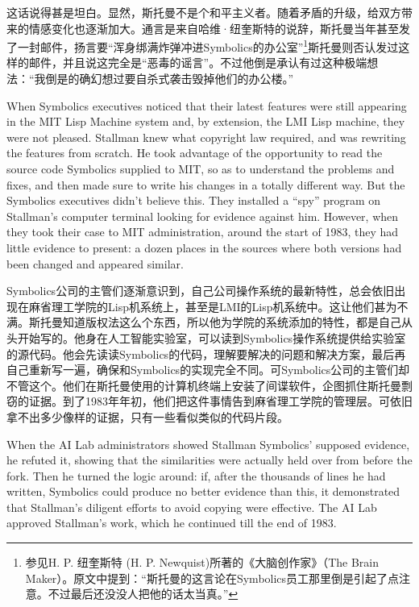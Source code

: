 \ifdefined\chs
这话说得甚是坦白。显然，斯托曼不是个和平主义者。随着矛盾的升级，给双方带来的情感变化也逐渐加大。通言是来自哈维·纽奎斯特的说辞，斯托曼当年甚至发了一封邮件，扬言要``浑身绑满炸弹冲进Symbolics的办公室''\footnote{参见H. P. 纽奎斯特 (H. P. Newquist)所著的《大脑创作家》（The Brain Maker）。原文中提到：``斯托曼的这言论在Symbolics员工那里倒是引起了点注意。不过最后还没没人把他的话太当真。''}斯托曼则否认发过这样的邮件，并且说这完全是``恶毒的谣言''。不过他倒是承认有过这种极端想法：``我倒是的确幻想过要自杀式袭击毁掉他们的办公楼。''
\fi
\fi

\ifdefined\vtwo
\ifdefined\eng
When Symbolics executives noticed that their latest features were still appearing in the MIT Lisp Machine system and, by extension, the LMI Lisp machine, they were not pleased. Stallman knew what copyright law required, and was rewriting the features from scratch.  He took advantage of the opportunity to read the source code Symbolics supplied to MIT, so as to understand the problems and fixes, and then made sure to write his changes in a totally different way.  But the Symbolics executives didn't believe this.  They installed a ``spy'' program on Stallman's computer terminal looking for evidence against him.  However, when they took their case to MIT administration, around the start of 1983, they had little evidence to present: a dozen places in the sources where both versions had been changed and appeared similar.
\fi

\ifdefined\chs
Symbolics公司的主管们逐渐意识到，自己公司操作系统的最新特性，总会依旧出现在麻省理工学院的Lisp机系统上，甚至是LMI的Lisp机系统中。这让他们甚为不满。斯托曼知道版权法这么个东西，所以他为学院的系统添加的特性，都是自己从头开始写的。他身在人工智能实验室，可以读到Symbolics操作系统提供给实验室的源代码。他会先读读Symbolics的代码，理解要解决的问题和解决方案，最后再自己重新写一遍，确保和Symbolics的实现完全不同。可Symbolics公司的主管们却不管这个。他们在斯托曼使用的计算机终端上安装了间谍软件，企图抓住斯托曼剽窃的证据。到了1983年年初，他们把这件事情告到麻省理工学院的管理层。可依旧拿不出多少像样的证据，只有一些看似类似的代码片段。
\fi

\ifdefined\eng
When the AI Lab administrators showed Stallman Symbolics' supposed evidence, he refuted it, showing that the similarities were actually held over from before the fork.  Then he turned the logic around: if, after the thousands of lines he had written, Symbolics could produce no better evidence than this, it demonstrated that Stallman's diligent efforts to avoid copying were effective.  The AI Lab approved Stallman's work, which he continued till the end of 1983.
\fi

